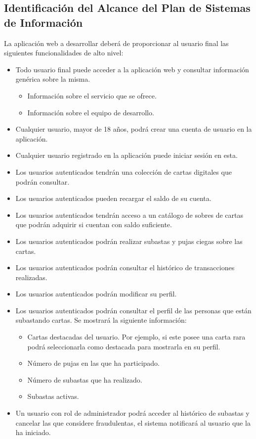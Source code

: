 \subsection{Identificación del Alcance del Plan de Sistemas de Información} \hypertarget{sec:2_identificacion_alcance_PSI}{}
La aplicación web a desarrollar deberá de proporcionar al usuario final las siguientes funcionalidades de alto nivel:
\begin{itemize}
    \item Todo usuario final puede acceder a la aplicación web y consultar información genérica sobre la misma.
    \begin{itemize}
        \item Información sobre el servicio que se ofrece.
        \item Información sobre el equipo de desarrollo.
    \end{itemize}
    \item Cualquier usuario, mayor de 18 años, podrá crear una cuenta de usuario en la aplicación.
    \item Cualquier usuario registrado en la aplicación puede iniciar sesión en esta.
    \item Los usuarios autenticados tendrán una colección de cartas digitales que podrán consultar.
    \item Los usuarios autenticados pueden recargar el saldo de su cuenta.
    \item Los usuarios autenticados tendrán acceso a un catálogo de sobres de cartas que podrán adquirir si cuentan con saldo suficiente.
    \item Los usuarios autenticados podrán realizar subastas y pujas ciegas sobre las cartas.
    \item Los usuarios autenticados podrán consultar el histórico de transacciones realizadas.
    \item Los usuarios autenticados podrán modificar su perfil.
    \item Los usuarios autenticados podrán consultar el perfil de las personas que están subastando cartas. Se mostrará la siguiente información:
    \begin{itemize}
        \item Cartas destacadas del usuario. Por ejemplo, si este posee una carta rara podrá seleccionarla como destacada para mostrarla en su perfil.
        \item Número de pujas en las que ha participado.
        \item Número de subastas que ha realizado.
        \item Subastas activas.
    \end{itemize}
    \item Un usuario con rol de administrador podrá acceder al histórico de subastas y cancelar las que considere fraudulentas, el sistema notificará al usuario que la ha iniciado.
\end{itemize}

